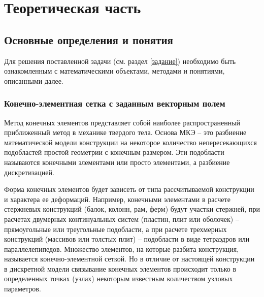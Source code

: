 \chapter{Теоретическая часть}

\section{Основные определения и понятия}
Для решения поставленной задачи (см. раздел \ref{задание}) необходимо быть ознакомленным с математическими объектами, методами и понятиями, описанными далее.
\subsection{Конечно-элементная сетка с заданным векторным полем}
Метод конечных элементов представляет собой наиболее распространенный приближенный метод в механике твердого тела. Основа МКЭ – это разбиение математической модели конструкции на некоторое количество непересекающихся подобластей простой геометрии с конечным размером. Эти подобласти называются конечными элементами или просто элементами, а разбиение дискретизацией.

Форма конечных элементов будет зависеть от типа рассчитываемой конструкции и характера ее деформаций. Например, конечными элементами в расчете стержневых конструкций (балок, колонн, рам, ферм) будут участки стержней, при расчетах двумерных континуальных систем (пластин, плит или оболочек) – прямоугольные или треугольные подобласти, а при расчете трехмерных конструкций (массивов или толстых плит) – подобласти в виде тетраэдров или параллелепипедов. Множество элементов, на которые разбита конструкция, называется конечно-элементной сеткой. Но в отличие от настоящей конструкции в дискретной модели связывание конечных элементов происходит только в определенных точках (узлах) некоторым известным количеством узловых параметров. \cite{chislaki}


